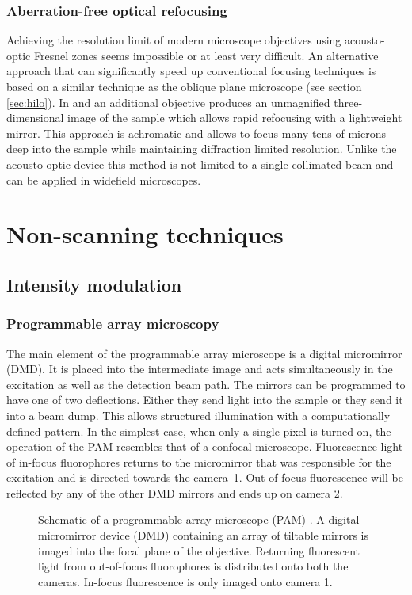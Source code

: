 \subsubsection{Aberration-free optical refocusing}
Achieving the resolution limit of modern microscope objectives using
acousto-optic Fresnel zones seems impossible or at least very
difficult. An alternative approach that can significantly speed up
conventional focusing techniques is based on a similar technique as
the oblique plane microscope (see section \ref{sec:hilo}). In
\cite{Botcherby2007} and \cite{botcherby2012aberration} an additional
objective produces an unmagnified three-dimensional image of the
sample which allows rapid refocusing with a lightweight mirror. This
approach is achromatic and allows to focus many tens of microns deep
into the sample while maintaining diffraction limited
resolution. Unlike the acousto-optic device this method is not limited
to a single collimated beam and can be applied in widefield
microscopes.

\section{Non-scanning techniques}
\subsection{Intensity modulation}
\subsubsection{Programmable array microscopy}
\label{ref:pam}
The main element of the programmable array microscope is a digital
micromirror (DMD). It is placed into the intermediate image and acts
simultaneously in the excitation as well as the detection beam
path. The mirrors can be programmed to have one of two
deflections. Either they send light into the sample or they send it
into a beam dump. This allows structured illumination with a
computationally defined pattern. In the simplest case, when only a
single pixel is turned on, the operation of the PAM resembles that of
a confocal microscope. Fluorescence light of in-focus fluorophores
returns to the micromirror that was responsible for the excitation and
is directed towards the camera~1. Out-of-focus fluorescence will be
reflected by any of the other DMD mirrors and ends up on camera 2.

\begin{figure}[htbp]
  \centering
  \caption{Schematic of a programmable array microscope (PAM)
    \citep[inspired from][]{Verveer1998}. A digital micromirror
    device (DMD) containing an array of tiltable mirrors is imaged
    into the focal plane of the objective. Returning fluorescent light
    from out-of-focus fluorophores is distributed onto both the
    cameras. In-focus fluorescence is only imaged onto camera 1.}
  \label{fig:pam-sketch}
\end{figure}


